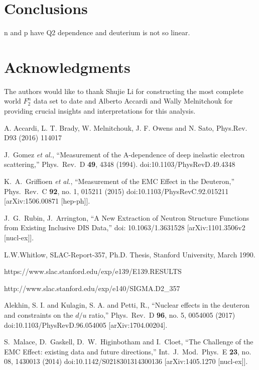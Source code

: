 \documentclass[oneside]{article}
\begin{document}
\section{Conclusions}
n and p have Q2 dependence and deuterium is not so linear. 



\section{Acknowledgments}

The authors would like to thank Shujie Li for constructing the most complete world $F_2^n$ data set to date and Alberto Accardi and Wally Melnitchouk for providing crucial insights and interpretations for this analysis.  


\begin{thebibliography}{99} 

 A. Accardi, L. T. Brady, W. Melnitchouk, J. F. Owens and N. Sato, Phys.Rev. D93 (2016) 114017

  J.~Gomez {\it et al.},
  ``Measurement of the A-dependence of deep inelastic electron scattering,''
  Phys.\ Rev.\ D {\bf 49}, 4348 (1994).
  doi:10.1103/PhysRevD.49.4348

  K.~A.~Griffioen {\it et al.},
  ``Measurement of the EMC Effect in the Deuteron,''
  Phys.\ Rev.\ C {\bf 92}, no. 1, 015211 (2015)
  doi:10.1103/PhysRevC.92.015211
  [arXiv:1506.00871 [hep-ph]].

  J.~G.~Rubin, J.~Arrington,
  ``A New Extraction of Neutron Structure Functions from Existing Inclusive DIS Data,''
  doi:	10.1063/1.3631528
  [arXiv:1101.3506v2 [nucl-ex]].
  
 L.W.Whitlow, SLAC-Report-357, Ph.D. Thesis, Stanford University, March 1990.

 https://www.slac.stanford.edu/exp/e139/E139.RESULTS

 http://www.slac.stanford.edu/exp/e140/SIGMA.D2\_357

 Alekhin, S. I. and Kulagin, S. A. and Petti, R.,
  ``Nuclear effects in the deuteron and constraints on the $d/u$ ratio,''
  Phys.\ Rev.\ D {\bf 96}, no. 5, 0054005 (2017)
  doi:10.1103/PhysRevD.96.054005
  [arXiv:1704.00204].

  S.~Malace, D.~Gaskell, D.~W.~Higinbotham and I.~Cloet,
  ``The Challenge of the EMC Effect: existing data and future directions,''
  Int.\ J.\ Mod.\ Phys.\ E {\bf 23}, no. 08, 1430013 (2014)
  doi:10.1142/S0218301314300136
  [arXiv:1405.1270 [nucl-ex]].
 
 
\end{thebibliography}
\end{document}
